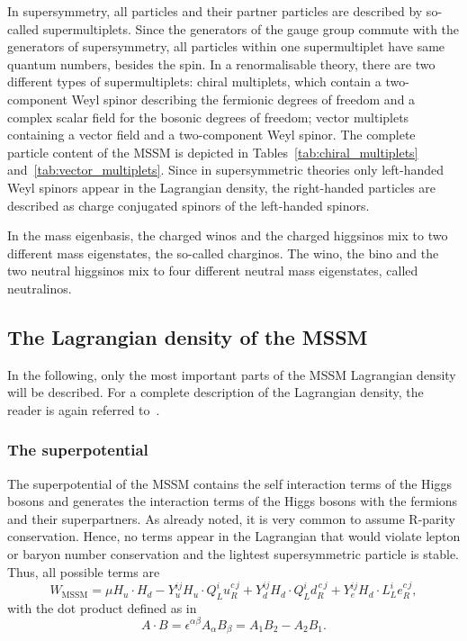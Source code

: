 In supersymmetry, all particles and their partner particles are described by so-called supermultiplets.
Since the generators of the gauge group commute with the generators of supersymmetry, all particles within one supermultiplet have same quantum numbers, besides the spin.
In a renormalisable theory, there are two different types of supermultiplets: chiral multiplets, which contain a two-component Weyl spinor describing the fermionic degrees of freedom and a complex scalar field for the bosonic degrees of freedom; vector multiplets containing a vector field and a two-component Weyl spinor.
The complete particle content of the MSSM is depicted in Tables~\ref{tab:chiral_multiplets} and~\ref{tab:vector_multiplets}. 
Since in supersymmetric theories only left-handed Weyl spinors appear in the Lagrangian density, the right-handed particles are described as charge conjugated spinors of the left-handed spinors.

In the mass eigenbasis, the charged winos and the charged higgsinos mix to two different mass eigenstates, the so-called charginos. 
The wino, the bino and the two neutral higgsinos mix to four different neutral mass eigenstates, called neutralinos.

\subsection{The Lagrangian density of the MSSM}
\label{sec:Lagrange_MSSM}
In the following, only the most important parts of the MSSM Lagrangian density will be described.
For a complete description of the Lagrangian density, the reader is again referred to~\cite{bib:Drees_2004}.

\subsubsection*{The superpotential}
The superpotential of the MSSM contains the self interaction terms of the Higgs bosons and generates the interaction terms of the Higgs bosons with the fermions and their superpartners.
As already noted, it is very common to assume R-parity conservation.
Hence, no terms appear in the Lagrangian that would violate lepton or baryon number conservation and the lightest supersymmetric particle is stable.
Thus, all possible terms are
\begin{equation}
\label{eq:SPMSSM}
 W_{\text{MSSM}} = \mu H_u \cdot H_d - Y_u^{ij} H_u \cdot Q_L^i u_R^{c\,j} + Y_d^{ij} H_d \cdot Q_L^i d_R^{\,c\,j} + Y_e^{ij} H_d \cdot L_L^i e_R^{c\,j},
\end{equation}
with the dot product defined as in~\cite{bib:Aitchison_2005} 
\begin{equation}
 A \cdot B = \epsilon^{\alpha\beta} A_{\alpha} B_{\beta} = A_1 B_2 - A_2 B_1.
\end{equation}


